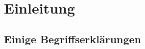 



\usepackage[utf8x]{inputenc} %




%


\newcommand{\vorname}{Patrick}
\newcommand{\nachname}{Hilgenstock}
\newcommand{\matrikelnummer}{2203656}

\newcommand{\titel}{Oregon\\[0.2ex] 
				\Large Eine Team-basierte Web-Applikation zur Stoff-Vertiefung}

\newcommand{\erstpruef}{Prof. Dr. Edmund Weitz}
\newcommand{\zweitpruef}{Prof. Dr Torsten Edeler}

\date{\sffamily Hamburg, 20.02.2017}  %



\maketitle           %
\tableofcontents %
\clearpage          %


\chapter{Einleitung}

\section{Einige Begriffserklärungen}

